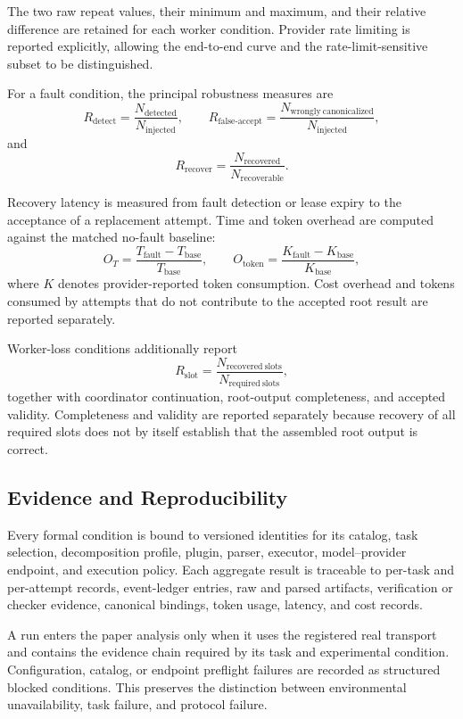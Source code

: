 \documentclass{article}
\theoremstyle{plain}
\begin{document}
The two raw repeat values, their minimum and maximum, and their relative
difference are retained for each worker condition. Provider rate limiting
is reported explicitly, allowing the end-to-end curve and the
rate-limit-sensitive subset to be distinguished.

For a fault condition, the principal robustness measures are
\[
R_{\mathrm{detect}}
=
\frac{N_{\mathrm{detected}}}{N_{\mathrm{injected}}},
\qquad
R_{\mathrm{false\mbox{-}accept}}
=
\frac{N_{\mathrm{wrongly\ canonicalized}}}
     {N_{\mathrm{injected}}},
\]
and
\[
R_{\mathrm{recover}}
=
\frac{N_{\mathrm{recovered}}}{N_{\mathrm{recoverable}}}.
\]

Recovery latency is measured from fault detection or lease expiry to the
acceptance of a replacement attempt. Time and token overhead are computed
against the matched no-fault baseline:
\[
O_T
=
\frac{T_{\mathrm{fault}}-T_{\mathrm{base}}}{T_{\mathrm{base}}},
\qquad
O_{\mathrm{token}}
=
\frac{K_{\mathrm{fault}}-K_{\mathrm{base}}}{K_{\mathrm{base}}},
\]
where \(K\) denotes provider-reported token consumption. Cost overhead and
tokens consumed by attempts that do not contribute to the accepted root
result are reported separately.

Worker-loss conditions additionally report
\[
R_{\mathrm{slot}}
=
\frac{N_{\mathrm{recovered\ slots}}}
     {N_{\mathrm{required\ slots}}},
\]
together with coordinator continuation, root-output completeness, and
accepted validity. Completeness and validity are reported separately
because recovery of all required slots does not by itself establish that
the assembled root output is correct.


\subsection{Evidence and Reproducibility}

Every formal condition is bound to versioned identities for its catalog,
task selection, decomposition profile, plugin, parser, executor,
model--provider endpoint, and execution policy. Each aggregate result is
traceable to per-task and per-attempt records, event-ledger entries, raw
and parsed artifacts, verification or checker evidence, canonical
bindings, token usage, latency, and cost records.

A run enters the paper analysis only when it uses the registered real
transport and contains the evidence chain required by its task and
experimental condition. Configuration, catalog, or endpoint preflight
failures are recorded as structured blocked conditions. This preserves
the distinction between environmental unavailability, task failure, and
protocol failure.
\end{document}
